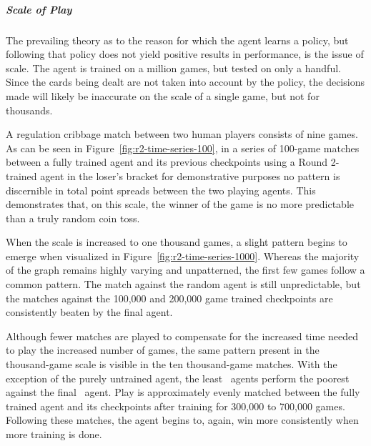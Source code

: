 \subparagraph*{Scale of Play}

The prevailing theory as to the reason for which the agent learns a policy,
but following that policy does not yield positive results in performance,
is the issue of scale.
%
The agent is trained on a million games,
but tested on only a handful.
%
Since the cards being dealt are not taken into account by the policy,
the decisions made will likely be inaccurate on the scale of a single game,
but not for thousands.




A regulation cribbage match between two human players consists of nine games.
%
As can be seen in Figure~\ref{fig:r2-time-series-100},
in a series of 100-game matches between a fully trained agent and its
previous checkpoints\textemdash
using a Round 2-trained agent in the loser's bracket for demonstrative
purposes\textemdash
no pattern is discernible in total point spreads between the two playing agents.
%
This demonstrates that,
on this scale,
the winner of the game is no more predictable than a truly random coin toss.

When the scale is increased to one thousand games,
a slight pattern begins to emerge
when visualized in Figure~\ref{fig:r2-time-series-1000}.
%
Whereas the majority of the graph remains highly varying and unpatterned,
the first few games follow a common pattern.
%
The match against the random agent is still unpredictable,
but the matches against the 100,000 and 200,000 game trained checkpoints are
consistently beaten by the final agent.

Although fewer matches are played to compensate for the increased time needed to
play the increased number of games,
the same pattern present in the thousand-game scale is visible in the
ten thousand-game matches.
%
With the exception of the purely untrained agent,
the least \learned\ agents perform the poorest against the final
\learned\ agent.
%
Play is approximately evenly matched between the fully trained agent
and its checkpoints after training for 300,000 to 700,000 games.
%
Following these matches,
the agent begins to, again, win more consistently when more training is done.

